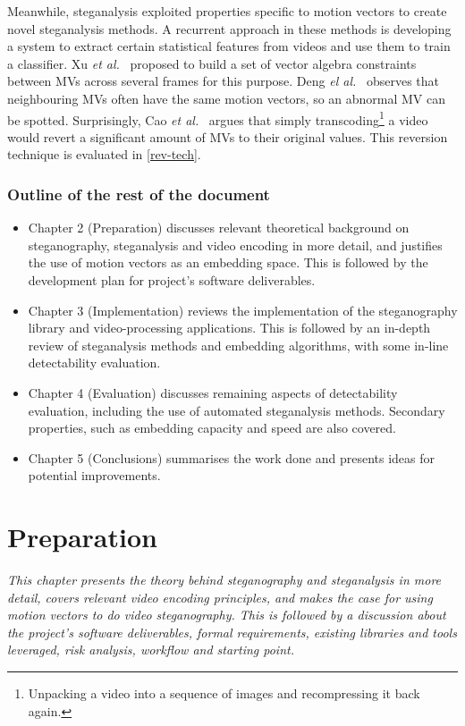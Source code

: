 \documentclass[12pt,british,twoside,notitlepage,usenames,dvipsnames,hypens,final]{report}
\numberwithin{equation}{section}
\numberwithin{figure}{section}
\begin{document}
Meanwhile, steganalysis exploited properties specific to motion vectors to create novel steganalysis methods. A recurrent approach in these methods is developing a system to extract certain statistical features from videos and use them to train a classifier. Xu \emph{et al.}~\cite{xu2013video} proposed to build a set of vector algebra constraints between MVs across several frames for this purpose. Deng \emph{el al.}~\cite{deng2012digital} observes that neighbouring MVs often have the same motion vectors, so an abnormal MV can be spotted. Surprisingly, Cao \emph{et al.}~\cite{cao2012video} argues that simply transcoding\footnote{Unpacking a video into a sequence of images and recompressing it back again.} a video would revert a significant amount of MVs to their original values. This reversion technique is evaluated in \ref{rev-tech}.

\subsection*{Outline of the rest of the document}
\begin{itemize}
\item Chapter 2 (Preparation) discusses relevant theoretical background on steganography, steganalysis and video encoding in more detail, and justifies the use of motion vectors as an embedding space. This is followed by the development plan for project's software deliverables. 
\item Chapter 3 (Implementation) reviews the implementation of the steganography library and video-processing applications. This is followed by an in-depth review of steganalysis methods and embedding algorithms, with some in-line detectability evaluation.
\item Chapter 4 (Evaluation) discusses remaining aspects of detectability evaluation, including the use of automated steganalysis methods. Secondary properties, such as embedding capacity and speed are also covered.
\item Chapter 5 (Conclusions) summarises the work done and presents ideas for potential improvements.
\end{itemize}
 

\cleardoublepage
\chapter{Preparation}

\textit{This chapter presents the theory behind steganography and steganalysis in more detail, covers relevant video encoding principles, and makes the case for using motion vectors to do video steganography. This is followed by a discussion about the project's software deliverables, formal requirements, existing libraries and tools leveraged, risk analysis, workflow and starting point.}
\end{document}
